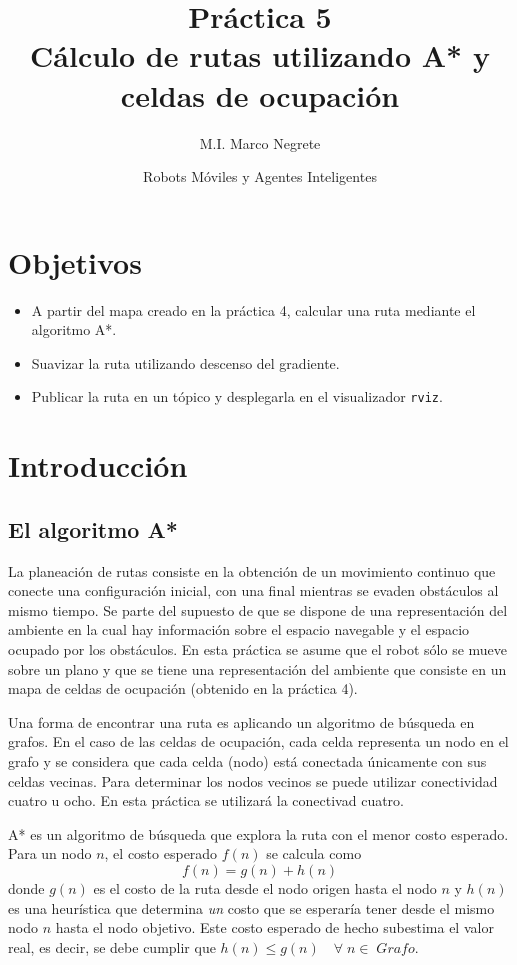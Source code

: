 \documentclass[letterpaper,12pt]{article}
\title{Práctica 5  \\ Cálculo de rutas utilizando A* y celdas de ocupación}
\author{M.I. Marco Negrete}
\date{Robots Móviles y Agentes Inteligentes}
\begin{document}
\renewcommand{\tablename}{Tabla}
\maketitle
\section*{Objetivos}
\begin{itemize}
\item A partir del mapa creado en la práctica 4, calcular una ruta mediante el algoritmo A*.
\item Suavizar la ruta utilizando descenso del gradiente. 
\item Publicar la ruta en un tópico y desplegarla en el visualizador \texttt{rviz}.
\end{itemize}

\section{Introducción}
\subsection{El algoritmo A*}
La planeación de rutas consiste en la obtención de un movimiento continuo que conecte una configuración inicial, con una final mientras se evaden obstáculos al mismo tiempo. Se parte del supuesto de que se dispone de una representación del ambiente en la cual hay información sobre el espacio navegable y el espacio ocupado por los obstáculos. En esta práctica se asume que el robot sólo se mueve sobre un plano y que se tiene una representación del ambiente que consiste en un mapa de celdas de ocupación (obtenido en la práctica 4). 

Una forma de encontrar una ruta es aplicando un algoritmo de búsqueda en grafos. En el caso de las celdas de ocupación, cada celda representa un nodo en el grafo y se considera que cada celda (nodo) está conectada únicamente con sus celdas vecinas. Para determinar los nodos vecinos se puede utilizar conectividad cuatro u ocho. En esta práctica se utilizará la conectivad cuatro. 

A* es un algoritmo de búsqueda que explora la ruta con el menor costo esperado. Para un nodo $n$, el costo esperado $f(n)$ se calcula como 
\[f(n) = g(n) + h(n)\]
donde $g(n)$ es el costo de la ruta desde el nodo origen hasta el nodo $n$ y $h(n)$ es una heurística que determina \textit{un} costo que se esperaría tener desde el mismo nodo $n$ hasta el nodo objetivo. Este costo esperado de hecho subestima el valor real, es decir, se debe cumplir que $h(n) \leq g(n)\quad \forall\; n \in\; Grafo$. 
\end{document}
